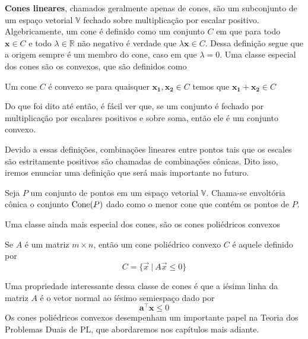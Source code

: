 \textbf{Cones lineares}, chamados geralmente apenas de cones, são um subconjunto de um espaço vetorial $\mathbb{V}$ fechado sobre multiplicação por escalar positivo. Algebricamente, um cone é definido como um conjunto $C$ em que para todo $\mathbf{x} \in C$ e todo $\lambda \in \mathbb{R}$ não negativo é verdade que \(\lambda \mathbf{x} \in C\). Dessa definição segue que a origem sempre é um membro do cone, caso em que $\lambda = 0$. Uma classe especial dos cones são os convexos, que são definidos como

\begin{def:cone convexo}
	Um cone $C$ é convexo se para quaisquer $\mathbf{x_1, x_2} \in C$ temos que $\mathbf{x_1} + \mathbf{x_2} \in C$
\end{def:cone convexo}

Do que foi dito até então, é fácil ver que, se um conjunto é fechado por multiplicação por escalares positivos e sobre soma, então ele é um conjunto convexo.

Devido a essas definições, combinações lineares entre pontos tais que os escales são estritamente positivos são chamadas de combinações cônicas. Dito isso, iremos enunciar uma definição que será mais importante no futuro.

\begin{def:cone hull}
	Seja $P$ um conjunto de pontos em um espaço vetorial $\mathbb{V}$. Chama-se envoltória cônica o conjunto $\mathrm{Cone}(P)$ dado como o menor cone que contém os pontos de $P$.
\end{def:cone hull}

Uma classe ainda mais especial dos cones, são os cones poliédricos convexos

\begin{def:cpc}
	Se $A$ é um matriz $m \times n$, então um cone poliédrico convexo $C$ é aquele definido por
	\begin{equation*}
		C = \{\vec{x}\ |\ A \vec{x} \leq 0\}
	\end{equation*}  
\end{def:cpc}

Uma propriedade interessante dessa classe de cones é que a iésima linha da matriz $A$ é o vetor normal ao íésimo semiespaço dado por \[\mathbf{a^\intercal x} \leq 0\]Os cones poliédricos convexos desempenham um importante papel na Teoria dos Problemas Duais de PL, que abordaremos nos capítulos mais adiante.

